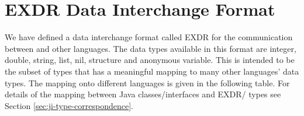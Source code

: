 %
% 
% 
% 
% 
%
%
%

\chapter{EXDR Data Interchange Format}
\label{chapexdr}

We have defined a data interchange format called EXDR for the
communication between {\eclipse} and other languages.  The data types
available in this format are integer, double, string, list, nil,
structure and anonymous variable.  This is intended to be the subset
of {\eclipse} types that has a meaningful mapping to many other
languages' data types.  The mapping onto different languages is given
in the following table. For details of the mapping between Java
classes/interfaces and EXDR/{\eclipse} types see Section
\ref{sec:ji-type-correspondence}.

